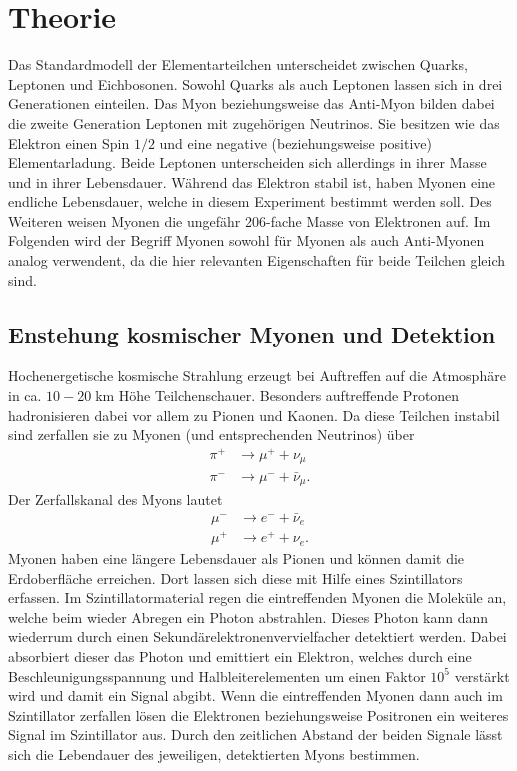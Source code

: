 \section{Theorie}
Das Standardmodell der Elementarteilchen unterscheidet zwischen Quarks, Leptonen und Eichbosonen.
Sowohl Quarks als auch Leptonen lassen sich in drei Generationen einteilen.
Das Myon beziehungsweise das Anti-Myon
bilden dabei die zweite Generation Leptonen mit zugehörigen Neutrinos. Sie besitzen wie das Elektron 
einen Spin $1/2$ und eine negative (beziehungsweise positive) Elementarladung. Beide Leptonen unterscheiden sich allerdings in ihrer Masse 
und in ihrer Lebensdauer. Während das Elektron stabil ist, haben Myonen eine endliche Lebensdauer, welche in diesem 
Experiment bestimmt werden soll. Des Weiteren weisen Myonen die ungefähr 206-fache Masse von Elektronen auf.
Im Folgenden wird der Begriff Myonen sowohl für Myonen als auch Anti-Myonen analog verwendent, da die hier 
relevanten Eigenschaften für beide Teilchen gleich sind.

\subsection{Enstehung kosmischer Myonen und Detektion}
Hochenergetische kosmische Strahlung erzeugt bei Auftreffen auf die Atmosphäre in ca. $10-20\;$km Höhe
Teilchenschauer. Besonders auftreffende Protonen hadronisieren dabei vor allem zu Pionen und Kaonen.
Da diese Teilchen instabil sind zerfallen sie zu Myonen (und entsprechenden Neutrinos) über
\begin{align*}
    \pi^{+} &\to \mu^{+} + \nu_{\mu} \\
    \pi^{-} &\to \mu^{-} + \bar{\nu}_{\mu}.
\end{align*}
Der Zerfallskanal des Myons lautet
\begin{align*}
    \mu^{-} &\to e^{-} + \bar{\nu}_{e} \\
    \mu^{+} &\to e^{+} + \nu_{e}.
\end{align*}
Myonen haben eine längere Lebensdauer als Pionen und können damit die Erdoberfläche erreichen.
Dort lassen sich diese mit Hilfe eines Szintillators erfassen. Im Szintillatormaterial regen die eintreffenden
Myonen die Moleküle an, welche beim wieder Abregen ein Photon abstrahlen. Dieses Photon kann dann wiederrum 
durch einen Sekundärelektronenvervielfacher detektiert werden. Dabei absorbiert dieser das Photon und emittiert
ein Elektron, welches durch eine Beschleunigungsspannung und Halbleiterelementen um einen Faktor $10^5$ verstärkt wird
und damit ein Signal abgibt.
Wenn die eintreffenden Myonen dann auch im Szintillator zerfallen lösen die Elektronen beziehungsweise Positronen 
ein weiteres Signal im Szintillator aus. Durch den zeitlichen Abstand der beiden Signale lässt sich 
die Lebendauer des jeweiligen, detektierten Myons bestimmen.

